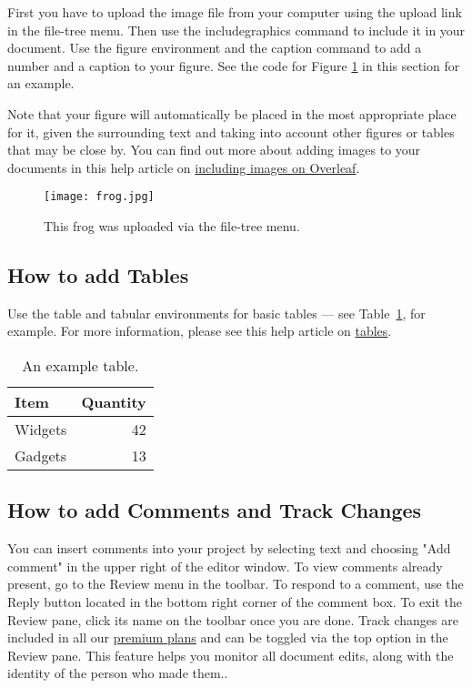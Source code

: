 \documentclass{article}
\begin{document}
First you have to upload the image file from your computer using the upload link in the file-tree menu. Then use the includegraphics command to include it in your document. Use the figure environment and the caption command to add a number and a caption to your figure. See the code for Figure \ref{fig:frog} in this section for an example.

Note that your figure will automatically be placed in the most appropriate place for it, given the surrounding text and taking into account other figures or tables that may be close by. You can find out more about adding images to your documents in this help article on \href{https://www.overleaf.com/learn/how-to/Including_images_on_Overleaf}{including images on Overleaf}.

\begin{figure}
\centering
\texttt{[image: frog.jpg]}
\caption{\label{fig:frog}This frog was uploaded via the file-tree menu.}
\end{figure}

\subsection{How to add Tables}

Use the table and tabular environments for basic tables --- see Table~\ref{tab:widgets}, for example. For more information, please see this help article on \href{https://www.overleaf.com/learn/latex/tables}{tables}. 

\begin{table}
\centering
\begin{tabular}{l|r}
Item & Quantity \\\hline
Widgets & 42 \\
Gadgets & 13
\end{tabular}
\caption{\label{tab:widgets}An example table.}
\end{table}

\subsection{How to add Comments and Track Changes}

You can insert comments into your project by selecting text and choosing "Add comment" in the upper right of the editor window. To view comments already present, go to the Review menu in the toolbar. To respond to a comment, use the Reply button located in the bottom right corner of the comment box. To exit the Review pane, click its name on the toolbar once you are done. Track changes are included in all our \href{https://www.overleaf.com/user/subscription/plans}{premium plans} and can be toggled via the top option in the Review pane. This feature helps you monitor all document edits, along with the identity of the person who made them.. 
\end{document}
